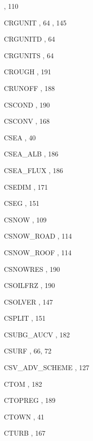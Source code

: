 \begin{theindex}
    \subitem {},  110
  \item CRGUNIT
    \subitem {},  64
    \subitem {},  145
  \item CRGUNITD
    \subitem {},  64
  \item CRGUNITS
    \subitem {},  64
  \item CROUGH
    \subitem {},  191
  \item CRUNOFF
    \subitem {},  188
  \item CSCOND
    \subitem {},  190
  \item CSCONV
    \subitem {},  168
  \item CSEA
    \subitem {},  40
  \item CSEA\_ALB
    \subitem {},  186
  \item CSEA\_FLUX
    \subitem {},  186
  \item CSEDIM
    \subitem {},  171
  \item CSEG
    \subitem {},  151
  \item CSNOW
    \subitem {},  109
  \item CSNOW\_ROAD
    \subitem {},  114
  \item CSNOW\_ROOF
    \subitem {},  114
  \item CSNOWRES
    \subitem {},  190
  \item CSOILFRZ
    \subitem {},  190
  \item CSOLVER
    \subitem {},  147
  \item CSPLIT
    \subitem {},  151
  \item CSUBG\_AUCV
    \subitem {},  182
  \item CSURF
    \subitem {},  66, 72
  \item CSV\_ADV\_SCHEME
    \subitem {},  127
  \item CTOM
    \subitem {},  182
  \item CTOPREG
    \subitem {},  189
  \item CTOWN
    \subitem {},  41
  \item CTURB
    \subitem {},  167

\end{theindex}

